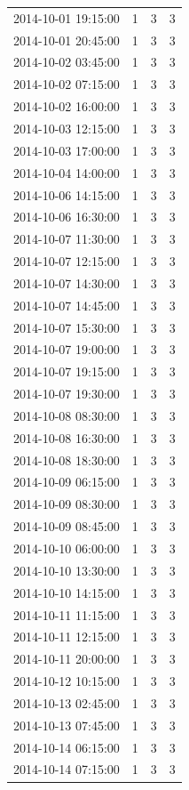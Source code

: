 \begin{tabular}{lrrr}
2014-10-01 19:15:00 & 1 & 3 & 3 \\
2014-10-01 20:45:00 & 1 & 3 & 3 \\
2014-10-02 03:45:00 & 1 & 3 & 3 \\
2014-10-02 07:15:00 & 1 & 3 & 3 \\
2014-10-02 16:00:00 & 1 & 3 & 3 \\
2014-10-03 12:15:00 & 1 & 3 & 3 \\
2014-10-03 17:00:00 & 1 & 3 & 3 \\
2014-10-04 14:00:00 & 1 & 3 & 3 \\
2014-10-06 14:15:00 & 1 & 3 & 3 \\
2014-10-06 16:30:00 & 1 & 3 & 3 \\
2014-10-07 11:30:00 & 1 & 3 & 3 \\
2014-10-07 12:15:00 & 1 & 3 & 3 \\
2014-10-07 14:30:00 & 1 & 3 & 3 \\
2014-10-07 14:45:00 & 1 & 3 & 3 \\
2014-10-07 15:30:00 & 1 & 3 & 3 \\
2014-10-07 19:00:00 & 1 & 3 & 3 \\
2014-10-07 19:15:00 & 1 & 3 & 3 \\
2014-10-07 19:30:00 & 1 & 3 & 3 \\
2014-10-08 08:30:00 & 1 & 3 & 3 \\
2014-10-08 16:30:00 & 1 & 3 & 3 \\
2014-10-08 18:30:00 & 1 & 3 & 3 \\
2014-10-09 06:15:00 & 1 & 3 & 3 \\
2014-10-09 08:30:00 & 1 & 3 & 3 \\
2014-10-09 08:45:00 & 1 & 3 & 3 \\
2014-10-10 06:00:00 & 1 & 3 & 3 \\
2014-10-10 13:30:00 & 1 & 3 & 3 \\
2014-10-10 14:15:00 & 1 & 3 & 3 \\
2014-10-11 11:15:00 & 1 & 3 & 3 \\
2014-10-11 12:15:00 & 1 & 3 & 3 \\
2014-10-11 20:00:00 & 1 & 3 & 3 \\
2014-10-12 10:15:00 & 1 & 3 & 3 \\
2014-10-13 02:45:00 & 1 & 3 & 3 \\
2014-10-13 07:45:00 & 1 & 3 & 3 \\
2014-10-14 06:15:00 & 1 & 3 & 3 \\
2014-10-14 07:15:00 & 1 & 3 & 3 \\

\end{tabular}
